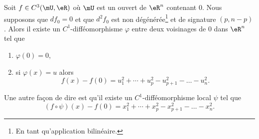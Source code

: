 \begin{lemma}     \label{LemNQAmCLo}
    Soit \( f\in C^3(\mU,\eR)\) où \( \mU\) est un ouvert de \( \eR^n\) contenant \( 0\). Nous supposons que \( df_0=0\) et que \( d^2f_0\) est non dégénérée\footnote{En tant qu'application bilinéaire.} et de signature \( (p,n-p)\). Alors il existe un \( C^1\)-difféomorphisme \( \varphi\) entre deux voisinages de \( 0\) dans \( \eR^n\) tel que
    \begin{enumerate}
        \item
            \( \varphi(0)=0\),
        \item
            si \( \varphi(x)=u\) alors
            \begin{equation}
                f(x)-f(0)=u_1^2+\cdots +u_p^2-u_{p+1}^2-\ldots-u_n^2.
            \end{equation}
    \end{enumerate}
    Une autre façon de dire est qu'il existe un \( C^1\)-difféomorphisme local \( \psi\) tel que
    \begin{equation}
        (f\circ\psi)(x)-f(0)=x_1^2+\cdots +x_p^2-x_{p+1}^2-\ldots-x_n^2.
    \end{equation}
\end{lemma}

